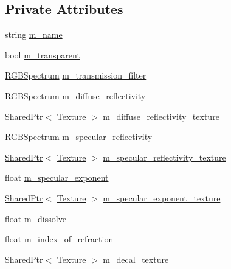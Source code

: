 \subsection*{Private Attributes}
\begin{DoxyCompactItemize}
\item 
string \hyperlink{structmage_1_1_material_a2b3e839a8ae093d53b12529d61ec6605}{m\+\_\+name}
\item 
bool \hyperlink{structmage_1_1_material_abaaf4666e33f4a7952ef9d0801e3f199}{m\+\_\+transparent}
\item 
\hyperlink{structmage_1_1_r_g_b_spectrum}{R\+G\+B\+Spectrum} \hyperlink{structmage_1_1_material_a9573a0d2a5fb0322f9eb103ace34dd47}{m\+\_\+transmission\+\_\+filter}
\item 
\hyperlink{structmage_1_1_r_g_b_spectrum}{R\+G\+B\+Spectrum} \hyperlink{structmage_1_1_material_afd2cc813023698e52edc01b267a17e6c}{m\+\_\+diffuse\+\_\+reflectivity}
\item 
\hyperlink{namespacemage_a1e01ae66713838a7a67d30e44c67703e}{Shared\+Ptr}$<$ \hyperlink{classmage_1_1_texture}{Texture} $>$ \hyperlink{structmage_1_1_material_a5193e30d3875695c96526a85edc84b88}{m\+\_\+diffuse\+\_\+reflectivity\+\_\+texture}
\item 
\hyperlink{structmage_1_1_r_g_b_spectrum}{R\+G\+B\+Spectrum} \hyperlink{structmage_1_1_material_a45587388f4ff57c209de2280b71af9d3}{m\+\_\+specular\+\_\+reflectivity}
\item 
\hyperlink{namespacemage_a1e01ae66713838a7a67d30e44c67703e}{Shared\+Ptr}$<$ \hyperlink{classmage_1_1_texture}{Texture} $>$ \hyperlink{structmage_1_1_material_ac925df9d71f8668c03e8efada632b300}{m\+\_\+specular\+\_\+reflectivity\+\_\+texture}
\item 
float \hyperlink{structmage_1_1_material_a62a9e8d9f90bf569b9f692c28da6a7dc}{m\+\_\+specular\+\_\+exponent}
\item 
\hyperlink{namespacemage_a1e01ae66713838a7a67d30e44c67703e}{Shared\+Ptr}$<$ \hyperlink{classmage_1_1_texture}{Texture} $>$ \hyperlink{structmage_1_1_material_a452a92691f612bd21857525c00c5e8e5}{m\+\_\+specular\+\_\+exponent\+\_\+texture}
\item 
float \hyperlink{structmage_1_1_material_a42b435ea58ce7da4b48febe9bb33aba7}{m\+\_\+dissolve}
\item 
float \hyperlink{structmage_1_1_material_a8b584541ab8bfc527f856c68bb0152e7}{m\+\_\+index\+\_\+of\+\_\+refraction}
\item 
\hyperlink{namespacemage_a1e01ae66713838a7a67d30e44c67703e}{Shared\+Ptr}$<$ \hyperlink{classmage_1_1_texture}{Texture} $>$ \hyperlink{structmage_1_1_material_acdab45e5d78ddbb7f717d9db67ff3fcf}{m\+\_\+decal\+\_\+texture}

\end{DoxyCompactItemize}

